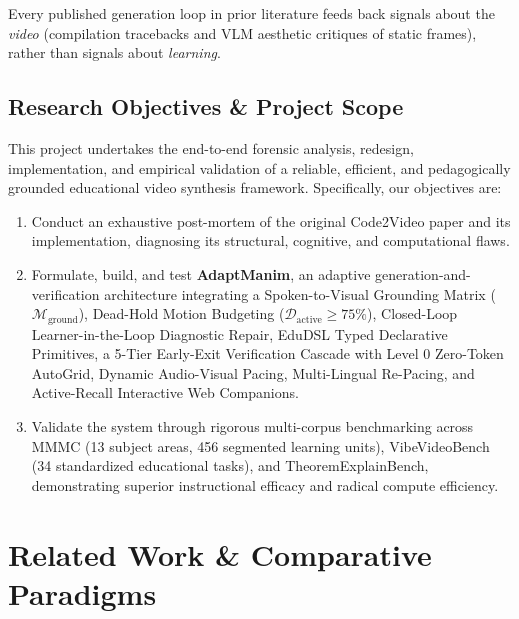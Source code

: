 \documentclass[11pt, a4paper]{article}
\begin{document}
Every published generation loop in prior literature feeds back signals about the \textit{video} (compilation tracebacks and VLM aesthetic critiques of static frames), rather than signals about \textit{learning}.

\subsection{Research Objectives \& Project Scope}
This project undertakes the end-to-end forensic analysis, redesign, implementation, and empirical validation of a reliable, efficient, and pedagogically grounded educational video synthesis framework. Specifically, our objectives are:
\begin{enumerate}[leftmargin=*]
    \item Conduct an exhaustive post-mortem of the original Code2Video paper and its implementation, diagnosing its structural, cognitive, and computational flaws.
    \item Formulate, build, and test \textbf{AdaptManim}, an adaptive generation-and-verification architecture integrating a Spoken-to-Visual Grounding Matrix ($\mathcal{M}_{\text{ground}}$), Dead-Hold Motion Budgeting ($\mathcal{D}_{\text{active}} \ge 75\%$), Closed-Loop Learner-in-the-Loop Diagnostic Repair, EduDSL Typed Declarative Primitives, a 5-Tier Early-Exit Verification Cascade with Level 0 Zero-Token AutoGrid, Dynamic Audio-Visual Pacing, Multi-Lingual Re-Pacing, and Active-Recall Interactive Web Companions.
    \item Validate the system through rigorous multi-corpus benchmarking across MMMC (13 subject areas, 456 segmented learning units), VibeVideoBench (34 standardized educational tasks), and TheoremExplainBench, demonstrating superior instructional efficacy and radical compute efficiency.
\end{enumerate}

\section{Related Work \& Comparative Paradigms}
\end{document}
